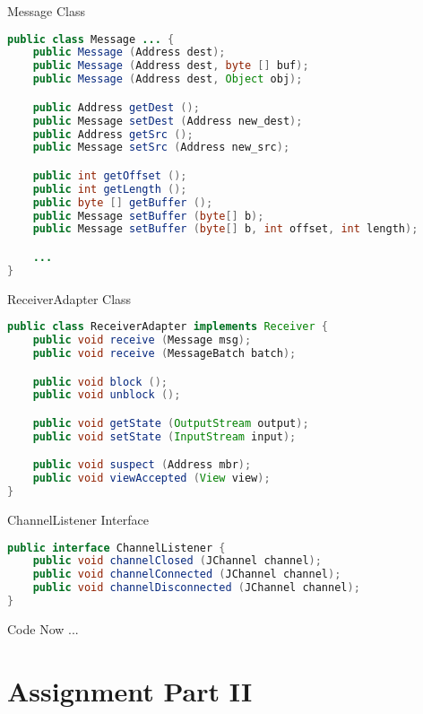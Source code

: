 \begin{frame}[fragile]{Message Class}
\begin{lstlisting}[language=java,style=mini]
public class Message ... {
    public Message (Address dest);
    public Message (Address dest, byte [] buf);
    public Message (Address dest, Object obj);

    public Address getDest ();
    public Message setDest (Address new_dest);
    public Address getSrc ();
    public Message setSrc (Address new_src);

    public int getOffset ();
    public int getLength ();
    public byte [] getBuffer ();
    public Message setBuffer (byte[] b);
    public Message setBuffer (byte[] b, int offset, int length);

    ...
}
\end{lstlisting}
\end{frame}


\begin{frame}[fragile]{ReceiverAdapter Class}
\begin{lstlisting}[language=java,style=mini]
public class ReceiverAdapter implements Receiver {
    public void receive (Message msg);
    public void receive (MessageBatch batch);

    public void block ();
    public void unblock ();

    public void getState (OutputStream output);
    public void setState (InputStream input);

    public void suspect (Address mbr);
    public void viewAccepted (View view);
}
\end{lstlisting}
\end{frame}


\begin{frame}[fragile]{ChannelListener Interface}
\begin{lstlisting}[language=java,style=mini]
public interface ChannelListener {
    public void channelClosed (JChannel channel);
    public void channelConnected (JChannel channel);
    public void channelDisconnected (JChannel channel);
}
\end{lstlisting}
\end{frame}


\begin{frame}{Code Now ...}
\end{frame}


\section{Assignment Part II}


